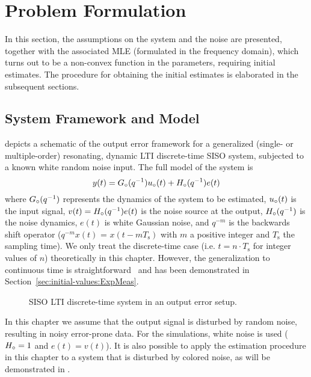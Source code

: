 \section{Problem Formulation}
\label{sec:initial-values:ProbForm}

In this section, the assumptions on the system and the noise are presented, together with the associated MLE (formulated in the frequency domain), which turns out to be a non-convex function in the parameters, requiring initial estimates. The procedure for obtaining the initial estimates is elaborated in the subsequent sections.

\subsection{System Framework and Model}
 depicts a schematic of the output error framework for  a generalized (single- or multiple-order) resonating, dynamic \gls{LTI} discrete-time \gls{SISO} system, subjected to a known white random noise input. 
The full model of the system is
\begin{equation}
y(t)={G}_{\circ}(q^{-1}){u}_{\circ}(t)+{H}_{\circ}(q^{-1})e(t)
\label{eq:initial-values:OE:TD}
\end{equation}
where ${G}_{\circ}(q^{-1})$ represents the dynamics of the system to be estimated, ${u}_{\circ}(t)$ is the input signal, $v(t)= {H}_{\circ}(q^{-1})e(t)$ is the noise source at the output, ${H}_{\circ}(q^{-1})$ is the noise dynamics, 
$e(t)$ is white Gaussian noise, and $q^{-m}$ is the backwards shift operator ($q^{-m}x(t)$ = $x(t-mT_{\mathrm{s}})$  with $m$ a positive integer and $T_{\mathrm{s}}$ the sampling time).
We only treat the discrete-time case (i.e. $t = n \cdot T_{\mathrm{s}}$ for integer values of $n$) theoretically in this chapter.
However, the generalization to continuous time is straightforward~\citep[Chapter 6]{Pintelon2012} and has been demonstrated in Section~\ref{sec:initial-values:ExpMeas}.

\begin{figure}[tbh]
\centering

\caption[Output-error set-up.]{SISO LTI discrete-time system in an output error setup.}
\label{fig:oesetup}
\end{figure}

In this chapter we assume that the output signal is disturbed by random noise, resulting in noisy error-prone data.
For the simulations, white noise is used (${H}_{\circ} = 1$ and $e(t) = v(t)$).
It is also possible to apply the estimation procedure in this chapter to a system that is disturbed by colored noise, as will be demonstrated in . 

